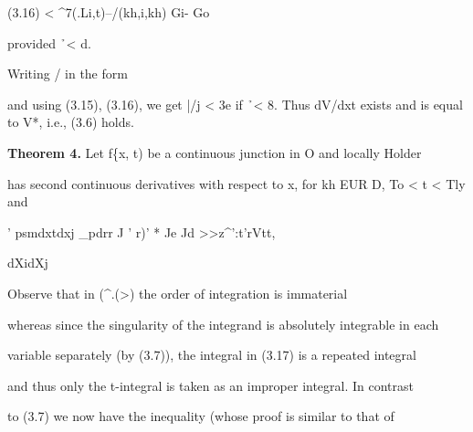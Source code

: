 \begin{ocrformula}
(3.16)                                                                         <
^7(.Li,t)--/(kh,i,kh)                                         Gi-      Go
\end{ocrformula}

\begin{ocrformula}
provided     \h\ < d.
\end{ocrformula}

Writing / in the form

\begin{ocrformula}
and     using (3.15), (3.16), we get |/j < 3e if \h\ <                                  8. Thus        dV/dxt   exists
and     is equal to V*, i.e., (3.6) holds.
\end{ocrformula}

\medskip\noindent\textbf{Theorem 4.} Let f\{x, t) be a continuous junction in O and locally Holder

\begin{ocrformula}
continuous      {exponent b) in i(u,      uniformly  with respect to t. Then V(x, t)
\end{ocrformula}

has second continuous derivatives with respect to x, for kh EUR D, To < t < Tly and

\begin{ocrformula}
'            psmdxtdxj          _pdrr                                       J    ' r)' *
Je            Jd >>z^':t'rVtt,
\end{ocrformula}

dXidXj

\begin{ocrformula}
Observe         that  in (^.(>) the order of integration is immaterial
\end{ocrformula}

whereas since the singularity of the integrand is absolutely integrable in each

\begin{ocrformula}
variable separately  (by (3.7)), the integral in (3.17) is a repeated integral
\end{ocrformula}

and thus only the t-integral is taken as an improper integral. In contrast

\begin{ocrformula}
to (3.7) we now  have the inequality    (whose  proof                                           is similar to that of
\end{ocrformula}

